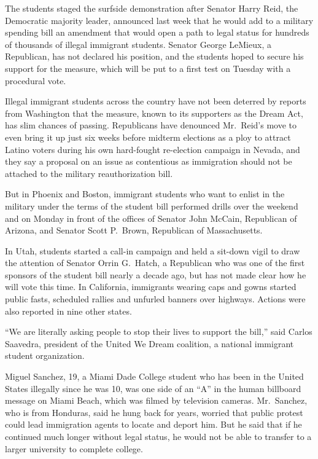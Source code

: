 ﻿\documentclass[12pt]{article}
\begin{document}
The students staged the surfside demonstration after Senator Harry Reid, the Democratic majority
leader, announced last week that he would add to a military spending bill an amendment that would
open a path to legal status for hundreds of thousands of illegal immigrant students. Senator George
LeMieux, a Republican, has not declared his position, and the students hoped to secure his support
for the measure, which will be put to a first test on Tuesday with a procedural vote.

Illegal immigrant students across the country have not been deterred by reports from Washington that
the measure, known to its supporters as the Dream Act, has slim chances of passing. Republicans have
denounced Mr.~Reid's move to even bring it up just six weeks before midterm elections as a ploy to
attract Latino voters during his own hard-fought re-election campaign in Nevada, and they say a
proposal on an issue as contentious as immigration should not be attached to the military
reauthorization bill.

But in Phoenix and Boston, immigrant students who want to enlist in the military under the terms of
the student bill performed drills over the weekend and on Monday in front of the offices of Senator
John McCain, Republican of Arizona, and Senator Scott P.~Brown, Republican of Massachusetts.

In Utah, students started a call-in campaign and held a sit-down vigil to draw the attention of
Senator Orrin G.~Hatch, a Republican who was one of the first sponsors of the student bill nearly a
decade ago, but has not made clear how he will vote this time. In California, immigrants wearing
caps and gowns started public fasts, scheduled rallies and unfurled banners over highways. Actions
were also reported in nine other states.

``We are literally asking people to stop their lives to support the bill,'' said Carlos Saavedra,
president of the United We Dream coalition, a national immigrant student organization.

Miguel Sanchez, 19, a Miami Dade College student who has been in the United States illegally since
he was 10, was one side of an ``A'' in the human billboard message on Miami Beach, which was filmed
by television cameras. Mr.~Sanchez, who is from Honduras, said he hung back for years, worried that
public protest could lead immigration agents to locate and deport him. But he said that if he
continued much longer without legal status, he would not be able to transfer to a larger university
to complete college.
\end{document}
